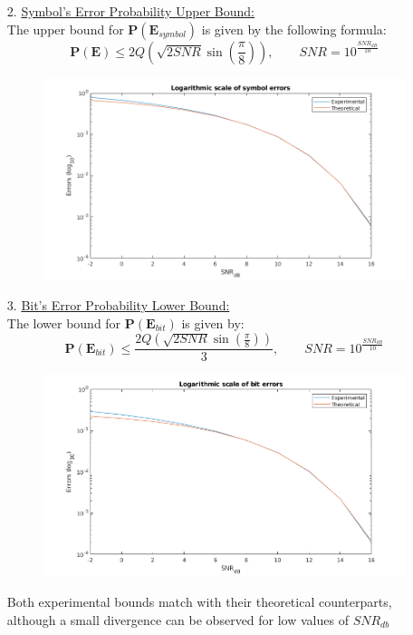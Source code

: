 \documentclass[12pt, a4paper]{article}
\begin{document}
\begin{enumerate}
\begin{enumerate}
        \item[2.] \underline{Symbol's Error Probability Upper Bound: }\\
        The upper bound for \( \textbf{P}(\textbf{E}_{symbol}) \) is given by the following formula:
        \[\textbf{P}(\textbf{E}) \le 2Q\left(\sqrt{2SNR}\sin\left(\frac{\pi}{8}\right)\right),\qquad
        SNR = 10^{\frac{SNR_{dB}}{10}}\]
        \begin{figure}[H]
            \centering
            \includegraphics[scale=0.6]{symb_err.png}
        \end{figure}

        \pagebreak
        \item[3.] \underline{Bit's Error Probability Lower Bound: }\\
        The lower bound for \( \textbf{P}(\textbf{E}_{bit}) \) is given by:
        \[\textbf{P}(\textbf{E}_{bit}) \le \frac{2Q\left(\sqrt{2SNR}\sin\left(\frac{\pi}{8}\right)\right)}{3},\qquad
        SNR = 10^{\frac{SNR_{dB}}{10}}\]
        \begin{figure}[H]
            \centering
            \includegraphics[scale=0.6]{bit_err_.png}
        \end{figure}

        Both experimental bounds match with their theoretical counterparts, although a small divergence can be observed for low values of \(SNR_{db}\)
    \end{enumerate}
\end{enumerate}
\end{document}
